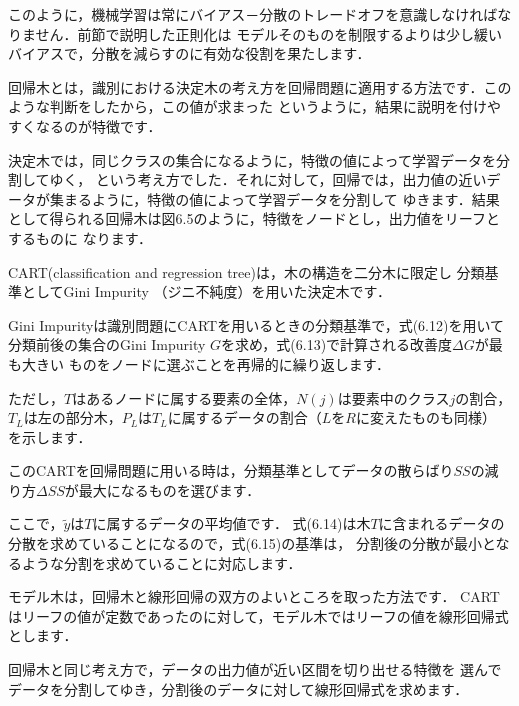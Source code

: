 このように，機械学習は常にバイアス－分散のトレードオフを意識しなければなりません．前節で説明した正則化は
モデルそのものを制限するよりは少し緩いバイアスで，分散を減らすのに有効な役割を果たします．


回帰木とは，識別における決定木の考え方を回帰問題に適用する方法です．このような判断をしたから，この値が求まった
というように，結果に説明を付けやすくなるのが特徴です．

決定木では，同じクラスの集合になるように，特徴の値によって学習データを分割してゆく，
という考え方でした．それに対して，回帰では，出力値の近いデータが集まるように，特徴の値によって学習データを分割して
ゆきます．結果として得られる回帰木は図6.5のように，特徴をノードとし，出力値をリーフとするものに
なります．



CART(classification and regression tree)は，木の構造を二分木に限定し
分類基準としてGini Impurity （ジニ不純度）を用いた決定木です．

Gini Impurityは識別問題にCARTを用いるときの分類基準で，式(6.12)を用いて
分類前後の集合のGini Impurity $G$を求め，式(6.13)で計算される改善度$\Delta G$が最も大きい
ものをノードに選ぶことを再帰的に繰り返します．



ただし，$T$はあるノードに属する要素の全体，$N(j)$は要素中のクラス$j$の割合，$T_L$は左の部分木，$P_L$は$T_L$に属するデータの割合（$L$を$R$に変えたものも同様）
を示します．


このCARTを回帰問題に用いる時は，分類基準としてデータの散らばり$SS$の減り方$\Delta SS$が最大になるものを選びます．



ここで，$\tilde{y}$は$T$に属するデータの平均値です．
式(6.14)は木$T$に含まれるデータの分散を求めていることになるので，式(6.15)の基準は，
分割後の分散が最小となるような分割を求めていることに対応します．


モデル木は，回帰木と線形回帰の双方のよいところを取った方法です．
CARTはリーフの値が定数であったのに対して，モデル木ではリーフの値を線形回帰式
とします．

回帰木と同じ考え方で，データの出力値が近い区間を切り出せる特徴を
選んでデータを分割してゆき，分割後のデータに対して線形回帰式を求めます．

